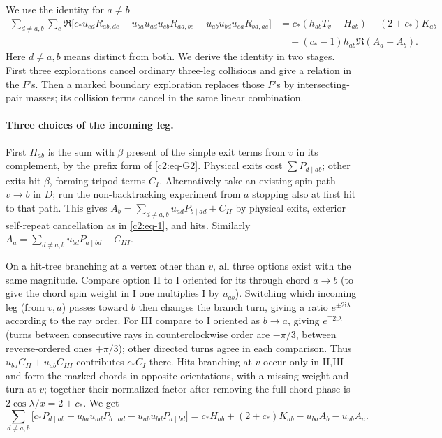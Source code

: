 We use the identity for \(a\ne b\)
\begin{equation}
\begin{split}
 \sum_{d\ne a,b}\sum_e \Re\big[
 c_* u_{ed}R_{ab,de}
 -u_{ba}u_{ad}u_{eb}R_{ad,be}-u_{ab}u_{bd}u_{ea}R_{bd,ae}\big]
 &= c_*(h_{ab}T_v-H_{ab})-(2+c_*)K_{ab}\\
 &\quad -(c_*-1)h_{ab}\Re(A_a+A_b). 
\end{split}                                                               \label{c2:eq-K1}
\end{equation}
Here \(d\ne a,b\) means distinct from both. We derive the identity in
two stages. First three explorations cancel ordinary three-leg collisions
and give a relation in the \(P\)'s. Then a marked boundary exploration
replaces those \(P\)'s by intersecting-pair masses; its collision terms
cancel in the same linear combination.

\paragraph{Three choices of the incoming leg.}
First \(H_{ab}\) is the sum with \(\beta\) present of the simple exit terms from \(v\) in its complement, by the prefix form of \eqref{c2:eq-G2}. Physical exits cost \(\sum P_{d\mid ab}\); other exits hit \(\beta\), forming tripod terms \(C_I\). Alternatively take an existing spin path \(v\to b\) in \(D\); run the non-backtracking experiment from \(a\) stopping also at first hit to that path. This gives \(A_b=\sum_{d\ne a,b} u_{ad}P_{b\mid ad}+C_{II}\) by physical exits, exterior self-repeat cancellation as in \eqref{c2:eq-1}, and hits. Similarly \(A_a=\sum_{d\ne a,b}u_{bd}P_{a\mid bd}+C_{III}\).

On a hit-tree branching at a vertex other than \(v\), all three options exist with the same magnitude. Compare option II to I oriented for its through chord \(a\to b\) (to give the chord spin weight in I one multiplies I by \(u_{ab}\)). Switching which incoming leg (from \(v,a\)) passes toward \(b\) then changes the branch turn, giving a ratio \(e^{\pm 2\mathrm i\lambda}\) according to the ray order. For III compare to I oriented as \(b\to a\), giving \(e^{\mp 2\mathrm i\lambda}\) (turns between consecutive rays in counterclockwise order are \(-\pi/3\), between reverse-ordered ones \(+\pi/3\)); other directed turns agree in each comparison. Thus \(u_{ba}C_{II}+u_{ab}C_{III}\) contributes \(c_* C_I\) there. Hits branching at \(v\) occur only in II,III and form the marked chords in opposite orientations, with a missing weight and turn at \(v\); together their normalized factor after removing the full chord phase is \(2\cos\lambda/x=2+c_*\). We get
\begin{equation}
 \sum_{d\ne a,b}\big[c_*P_{d\mid ab}
 -u_{ba}u_{ad}P_{b\mid ad}-u_{ab}u_{bd}P_{a\mid bd}\big]
 = c_*H_{ab}+(2+c_*)K_{ab}-u_{ba}A_b-u_{ab}A_a .                        \label{c2:eq-K1a}
\end{equation}

